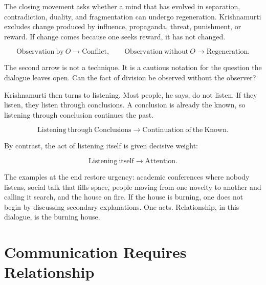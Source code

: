 \documentclass[11pt,oneside]{book}
\begin{document}
The closing movement asks whether a mind that has evolved in separation, contradiction, duality, and fragmentation can undergo regeneration. Krishnamurti excludes change produced by influence, propaganda, threat, punishment, or reward. If change comes because one seeks reward, it has not changed.

\begin{equation}
\mathrm{Observation\ by\ }O
\longrightarrow
\mathrm{Conflict},
\qquad
\mathrm{Observation\ without\ }O
\longrightarrow
\mathrm{Regeneration}.
\end{equation}

The second arrow is not a technique. It is a cautious notation for the question the dialogue leaves open. Can the fact of division be observed without the observer?

Krishnamurti then turns to listening. Most people, he says, do not listen. If they listen, they listen through conclusions. A conclusion is already the known, so listening through conclusion continues the past.

\begin{equation}
\mathrm{Listening\ through\ Conclusions}
\longrightarrow
\mathrm{Continuation\ of\ the\ Known}.
\end{equation}

By contrast, the act of listening itself is given decisive weight:

\begin{equation}
\mathrm{Listening\ itself}
\longrightarrow
\mathrm{Attention}.
\end{equation}

The examples at the end restore urgency: academic conferences where nobody listens, social talk that fills space, people moving from one novelty to another and calling it search, and the house on fire. If the house is burning, one does not begin by discussing secondary explanations. One acts. Relationship, in this dialogue, is the burning house.


\section{Communication Requires Relationship}
\end{document}
